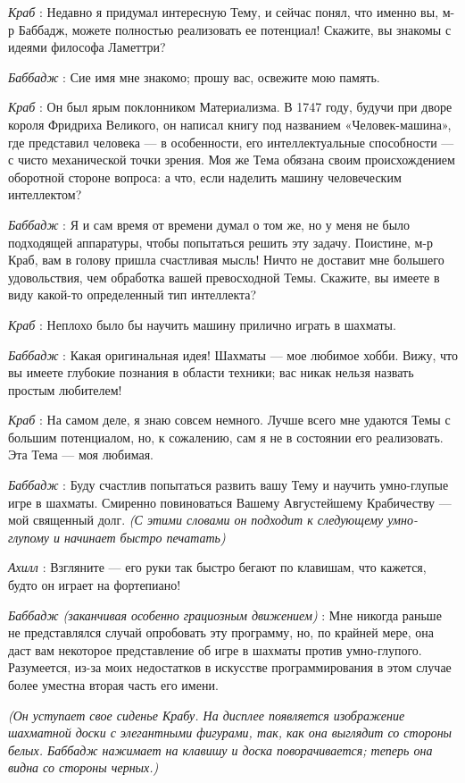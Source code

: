 \documentclass[../main.tex]{subfiles}
\begin{document}
\begin{dialogue}
\emph{Краб} : Недавно я придумал интересную Тему, и сейчас понял, что именно вы, м-р Баббадж, можете полностью реализовать ее потенциал! Скажите, вы знакомы с идеями философа Ламеттри?

\emph{Баббадж} : Сие имя мне знакомо; прошу вас, освежите мою память.

\emph{Краб} : Он был ярым поклонником Материализма. В 1747 году, будучи при дворе короля Фридриха Великого, он написал книгу под названием «Человек-машина», где представил человека --- в особенности, его интеллектуальные способности --- с чисто механической точки зрения. Моя же Тема обязана своим происхождением оборотной стороне вопроса: а что, если наделить машину человеческим интеллектом?

\emph{Баббадж} : Я и сам время от времени думал о том же, но у меня не было подходящей аппаратуры, чтобы попытаться решить эту задачу. Поистине, м-р Краб, вам в голову пришла счастливая мысль! Ничто не доставит мне большего удовольствия, чем обработка вашей превосходной Темы. Скажите, вы имеете в виду какой-то определенный тип интеллекта?

\emph{Краб} : Неплохо было бы научить машину прилично играть в шахматы.

\emph{Баббадж} : Какая оригинальная идея! Шахматы --- мое любимое хобби. Вижу, что вы имеете глубокие познания в области техники; вас никак нельзя назвать простым любителем!

\emph{Краб} : На самом деле, я знаю совсем немного. Лучше всего мне удаются Темы с большим потенциалом, но, к сожалению, сам я не в состоянии его реализовать. Эта Тема --- моя любимая.

\emph{Баббадж} : Буду счастлив попытаться развить вашу Тему и научить умно-глупые игре в шахматы. Смиренно повиноваться Вашему Августейшему Крабичеству --- мой священный долг. \emph{(С этими словами он подходит к следующему умно-глупому и начинает быстро печатать)}

\emph{Ахилл} : Взгляните --- его руки так быстро бегают по клавишам, что кажется, будто он играет на фортепиано!

\emph{Баббадж (заканчивая особенно грациозным движением)} : Мне никогда раньше не представлялся случай опробовать эту программу, но, по крайней мере, она даст вам некоторое представление об игре в шахматы против умно-глупого. Разумеется, из-за моих недостатков в искусстве программирования в этом случае более уместна вторая часть его имени.

\emph{(Он уступает свое сиденье Крабу. На дисплее появляется изображение шахматной доски с элегантными фигурами, так, как она выглядит со стороны белых. Баббадж нажимает на клавишу и доска поворачивается; теперь она видна со стороны черных.)}


\end{dialogue}
\end{document}
